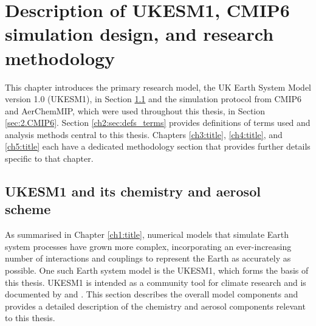 
\chapter{Description of UKESM1, CMIP6 simulation design, and research methodology}
\label{ch2:title}

This chapter introduces the primary research model, the UK Earth System Model version 1.0 (UKESM1), in Section \ref{sec:1.ukesm1} and the simulation protocol from CMIP6 and AerChemMIP, which were used throughout this thesis, in Section \ref{sec:2.CMIP6}. Section \ref{ch2:sec:defs_terms} provides definitions of terms used and analysis methods central to this thesis. Chapters \ref{ch3:title}, \ref{ch4:title}, and \ref{ch5:title} each have a dedicated methodology section that provides further details specific to that chapter.

\section{UKESM1 and its chemistry and aerosol scheme}  
\label{sec:1.ukesm1}

As summarised in Chapter \ref{ch1:title}, numerical models that simulate Earth system processes have grown more complex, incorporating an ever-increasing number of interactions and couplings to represent the Earth as accurately as possible. One such Earth system model is the UKESM1, which forms the basis of this thesis. UKESM1 is intended as a community tool for climate research and is documented by \citet{sellarUKESM1DescriptionEvaluation2019} and \citet{mulcahyUKESM11DevelopmentEvaluation2023}. This section describes the overall model components and provides a detailed description of the chemistry and aerosol components relevant to this thesis.


